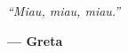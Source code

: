 

\vspace*{4.5cm}
\epigraph{\textit{``Miau, miau, miau.''}}{\vspace{0.4cm}\textcolor{%
\accentColor}{%
\textbf{--- Greta}}}
